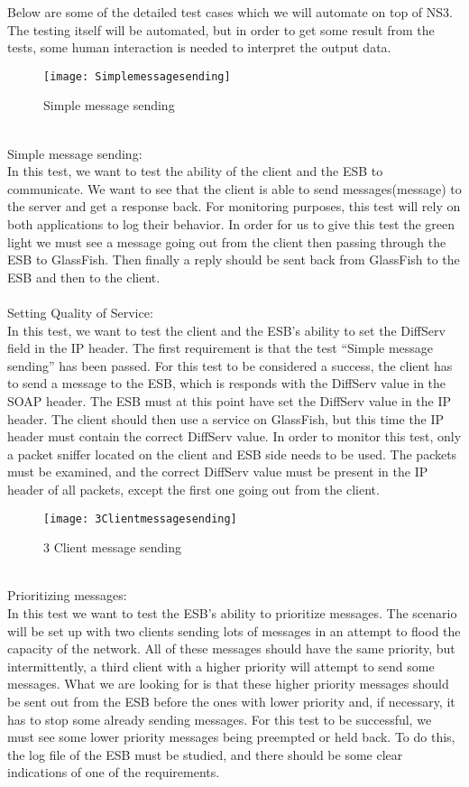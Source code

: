     Below are some of the detailed test cases which we will automate on top of NS3. The testing itself will be automated, but in order to get some result from the tests, some human interaction is needed to interpret the output data.
\\
    \begin{figure}[h]
        \centering
        \texttt{[image: Simplemessagesending]}
        \caption{Simple message sending}
        \label{fig:Simple message sending}
    \end{figure}
\\
Simple message sending:\\
    In this test, we want to test the ability of the client and the ESB to communicate. We want to see that the client is able to send messages(\gls{message}) to the server and get a response back. For monitoring purposes, this test will rely on both applications to log their behavior. In order for us to give this test the green light we must see a message going out from the client then passing through the ESB to GlassFish. Then finally a reply should be sent back from GlassFish to the ESB and then to the client.
\\\\
Setting Quality of Service:\\
    In this test, we want to test the client and the ESB’s ability to set the DiffServ field in the IP header. The first requirement is that the test “Simple message sending” has been passed. For this test to be considered a success, the client has to send a message to the ESB, which is responds with the DiffServ value in the SOAP header. The ESB must at this point have set the DiffServ value in the IP header. The client should then use a service on GlassFish, but this time the IP header must contain the correct DiffServ value. In order to monitor this test, only a packet sniffer located on the client and ESB side needs to be used. The packets must be examined, and the correct DiffServ value must be present in the IP header of all packets, except the first one going out from the client.
\\
    \begin{figure}[h]
        \centering
        \texttt{[image: 3Clientmessagesending]}
        \caption{3 Client message sending}
        \label{fig:threeclientmessagesending}
    \end{figure}
\\   
Prioritizing messages:\\
    In this test we want to test the ESB’s ability to prioritize messages. The scenario will be set up with two clients sending lots of messages in an attempt to flood the capacity of the network. All of these messages should have the same priority, but intermittently, a third client with a higher priority will attempt to send some messages. What we are looking for is that these higher priority messages should be sent out from the ESB before the ones with lower priority and, if necessary, it has to stop some already sending messages. For this test to be successful, we must see some lower priority messages being preempted or held back. To do this, the log file of the ESB must be studied, and there should be some clear indications of one of the requirements.
